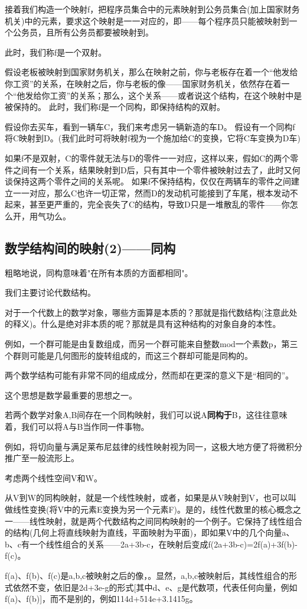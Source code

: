 接着我们构造一个映射f，把程序员集合中的元素映射到公务员集合(加上国家财务机关)中的元素，要求这个映射是一一对应的，即——每个程序员只能被映射到一个公务员，且所有公务员都要被映射到。

此时，我们称f是一个双射。

假设老板被映射到国家财务机关，那么在映射之前，你与老板存在着一个“他发给你工资”的关系，在映射之后，你与老板的像——国家财务机关，依然存在着一个“他发给你工资”的关系；那么，这个关系——或者说这个结构，在这个映射中是被保持的。
此时，我们称f是一个同构，即保持结构的双射。

假设你去买车，看到一辆车C，我们来考虑另一辆新造的车D。
假设有一个同构f将C映射到D。(我们此时可将映射f视为一个施加给C的变换，它将C车变换为D车)

如果f不是双射，C的零件就无法与D的零件一一对应，这样以来，假如C的两个零件之间有一个关系，结果映射到D后，只有其中一个零件被映射过去了，此时又何谈保持这两个零件之间的关系呢。
如果f不保持结构，仅仅在两辆车的零件之间建立一一对应，那么C也许一切正常，然而D的发动机可能接到了车尾，根本发动不起来，甚至更严重的，完全丧失了C的结构，导致D只是一堆散乱的零件——你怎么开，用气功么。

\subsection{数学结构间的映射(2)——同构}
粗略地说，同构意味着"在所有本质的方面都相同"。

我们主要讨论代数结构。

对于一个代数上的数学对象，哪些方面算是本质的？那就是指代数结构(注意此处的释义)。什么是绝对非本质的呢？那就是具有这种结构的对象自身的本性。

例如，一个群可能是由复数组成，而另一个群可能来自整数mod一个素数p，第三个群则可能是几何图形的旋转组成的，而这三个群却可能是同构的。

两个数学结构可能有非常不同的组成成分，然而却在更深的意义下是“相同的”。

这个思想是数学最重要的思想之一。

若两个数学对象A,B间存在一个同构映射，我们可以说A\textbf{同构于}B，这往往意味着，我们可以将A与B当作同一件事物。

例如，将切向量与满足莱布尼兹律的线性映射视为同一，这极大地方便了将微积分推广至一般流形上。

考虑两个线性空间V和W。

从V到W的同构映射，就是一个线性映射，或者，如果是从V映射到V，也可以叫做线性变换(将V中的元素E变换为另一个元素F)。是的，线性代数里的核心概念之一——线性映射，就是两个代数结构之间同构映射的一个例子。它保持了线性组合的结构(几何上将直线映射为直线，平面映射为平面)，即如果V中的几个向量a、b、c有一个线性组合的关系——2a+3b-c，在映射后变成f(2a+3b-c)=2f(a)+3f(b)-f(c)。

f(a)、f(b)、f(c)是a,b,c被映射之后的像，。显然，a,b,c被映射后，其线性组合的形式依然不变，依旧是2d+3e-g的形式[其中d、e、g是代数项，代表任何向量，例如f(a)、f(b)]，而不是别的，例如114d+514e+3.1415g。
